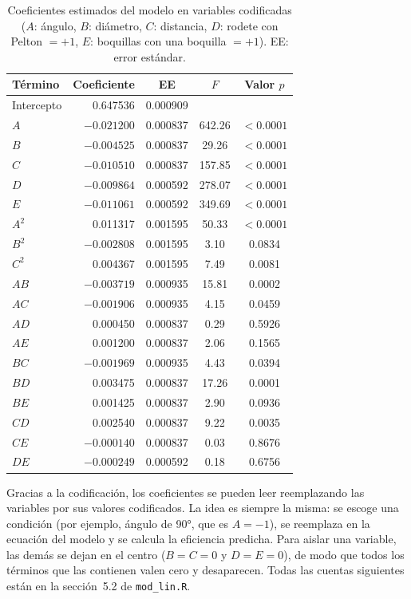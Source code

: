 \begin{table}[ht]
\centering
\caption{Coeficientes estimados del modelo en variables codificadas ($A$: ángulo, $B$: diámetro, $C$: distancia, $D$: rodete con Pelton $= +1$, $E$: boquillas con una boquilla $= +1$). EE: error estándar.}
\label{tab:coeficientes}
\begin{tabular}{lrccc}
\toprule
Término & Coeficiente & EE & $F$ & Valor $p$ \\
\midrule
Intercepto & 0.647536 & 0.000909 &        &            \\
$A$        & $-0.021200$ & 0.000837 & 642.26 & $<0.0001$ \\
$B$        & $-0.004525$ & 0.000837 &  29.26 & $<0.0001$ \\
$C$        & $-0.010510$ & 0.000837 & 157.85 & $<0.0001$ \\
$D$        & $-0.009864$ & 0.000592 & 278.07 & $<0.0001$ \\
$E$        & $-0.011061$ & 0.000592 & 349.69 & $<0.0001$ \\
$A^2$      &  0.011317 & 0.001595 &  50.33 & $<0.0001$ \\
$B^2$      & $-0.002808$ & 0.001595 &   3.10 & 0.0834 \\
$C^2$      &  0.004367 & 0.001595 &   7.49 & 0.0081 \\
$AB$       & $-0.003719$ & 0.000935 &  15.81 & 0.0002 \\
$AC$       & $-0.001906$ & 0.000935 &   4.15 & 0.0459 \\
$AD$       &  0.000450 & 0.000837 &   0.29 & 0.5926 \\
$AE$       &  0.001200 & 0.000837 &   2.06 & 0.1565 \\
$BC$       & $-0.001969$ & 0.000935 &   4.43 & 0.0394 \\
$BD$       &  0.003475 & 0.000837 &  17.26 & 0.0001 \\
$BE$       &  0.001425 & 0.000837 &   2.90 & 0.0936 \\
$CD$       &  0.002540 & 0.000837 &   9.22 & 0.0035 \\
$CE$       & $-0.000140$ & 0.000837 &   0.03 & 0.8676 \\
$DE$       & $-0.000249$ & 0.000592 &   0.18 & 0.6756 \\
\bottomrule
\end{tabular}
\end{table}

Gracias a la codificación, los coeficientes se pueden leer reemplazando las variables por sus valores codificados. La idea es siempre la misma: se escoge una condición (por ejemplo, ángulo de 90°, que es $A = -1$), se reemplaza en la ecuación del modelo y se calcula la eficiencia predicha. Para aislar una variable, las demás se dejan en el centro ($B = C = 0$ y $D = E = 0$), de modo que todos los términos que las contienen valen cero y desaparecen. Todas las cuentas siguientes están en la sección~5.2 de \texttt{mod\_lin.R}.

